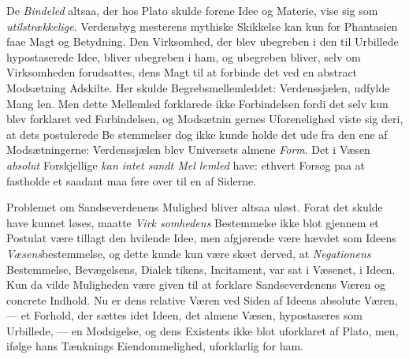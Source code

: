De \emph{Bindeled} altsaa, der hos Plato skulde forene Idee
og Materie, vise sig som \emph{utilstrækkelige}. Verdensbyg\-%
mesterens mythiske Skikkelse kan kun for Phantasien faae
Magt og Betydning. Den Virksomhed, der blev ubegreben i
den til Urbillede hypostaserede Idee, bliver ubegreben i ham,
og ubegreben bliver, selv om Virksomheden forudsattes, dens
Magt til at forbinde det ved en abstract Modsætning Adskilte.
Her skulde Begrebsmellemleddet: Verdenssjælen, udfylde Mang\-%
len. Men dette Mellemled forklarede ikke Forbindelsen fordi
det selv kun blev forklaret ved Forbindelsen, og Modsætnin\-%
gernes Uforenelighed viste sig deri, at dets postulerede Be\-%
stemmelser dog ikke kunde holde det ude fra den ene af
Modsætningerne: Verdenssjælen blev Universets almene \emph{Form}.
Det i Væsen \emph{absolut} Forskjellige \emph{kan intet sandt Mel\-%
lemled} have: ethvert Forsøg paa at fastholde et saadant maa
føre over til en af Siderne.

Problemet om Sandseverdenens Mulighed bliver altsaa
uløst. Forat det skulde have kunnet løses, maatte \emph{Virk\-%
somhedens} Bestemmelse ikke blot gjennem et Postulat være
tillagt den hvilende Idee, men afgjørende være hævdet som
Ideens \emph{Væsens}bestemmelse, og dette kunde kun være skeet
derved, at \emph{Negationens} Bestemmelse, Bevægelsens, Dialek\-%
tikens, Incitament, var sat i Væsenet, i Ideen. Kun da vilde
Muligheden være given til at forklare Sandseverdenens Væren
og concrete Indhold. Nu er dens relative Væren ved Siden af
Ideens absolute Væren, --- et Forhold, der sættes idet Ideen,
det almene Væsen, hypostaseres som Urbillede, --- en Modsigelse,
og dens Existents ikke blot uforklaret af Plato, men, ifølge hans
Tænknings Eiendommelighed, uforklarlig for ham.


